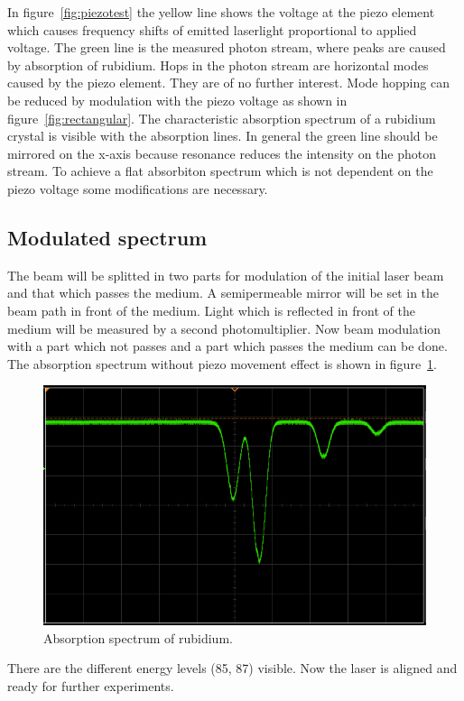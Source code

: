 In figure~\ref{fig:piezotest} the yellow line shows the voltage at the piezo
element which causes frequency shifts of emitted laserlight proportional to
applied voltage.
The green line is the measured photon stream, where peaks are caused by
absorption of rubidium. 
Hops in the photon stream are horizontal modes caused by the piezo element.
They are of no further interest.
Mode hopping can be reduced by modulation with the piezo voltage as shown in 
figure~\ref{fig:rectangular}.
The characteristic absorption spectrum of a rubidium crystal is visible with the
absorption lines. 
In general the green line should be mirrored on the x-axis because resonance
reduces the intensity on the photon stream. 
To achieve a flat absorbiton spectrum which is not dependent on the piezo voltage some
modifications are necessary.

\subsection{Modulated spectrum}%
\label{sub:modulated_spectrum}

The beam will be splitted in two parts
for modulation of the initial laser beam and that which passes the medium.
A semipermeable mirror will be set in the beam path in front of the medium. 
Light which is reflected in front of the medium will be measured by a second photomultiplier.
Now beam modulation with a part which not passes and a part which passes the
medium can be done. 
The absorption spectrum without piezo movement effect is shown in figure~\ref{fig:modulation}.
\begin{figure}[h]
		\centering
		\includegraphics[width=0.8\linewidth]{./content/pictures/scope_140.png}
		\caption{Absorption spectrum of rubidium.}%
		\label{fig:modulation}
\end{figure}
There are the different energy levels (85, 87) visible.
Now the laser is aligned and ready for further experiments.
